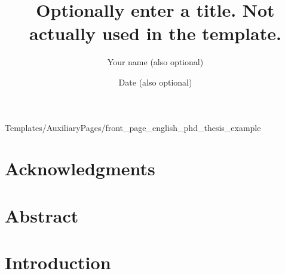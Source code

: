 \documentclass[a4paper,12pt,twoside]{book}
\title{Optionally enter a title. Not actually used in the template.}
\author{Your name (also optional)}
\date{Date (also optional)}
\begin{document}
\frontmatter
\pagestyle{empty}

        {Templates/AuxiliaryPages/front_page_english_phd_thesis_example}


\chapter*{Acknowledgments}
    \thispagestyle{empty}

\pagestyle{fancy}
\fancyhf{} %
\fancyhead[LE]{\nouppercase{\leftmark}}  %
\fancyhead[RO]{\nouppercase{\rightmark}}  %

\renewcommand{\headrulewidth}{0.4pt}  %


\chapter*{Abstract}
    \setcounter{page}{1}

    \tableofcontents
\clearpage

    \listoffigures
\clearpage



\mainmatter
\chapter{Introduction}
\label{sec_intro}
\end{document}
